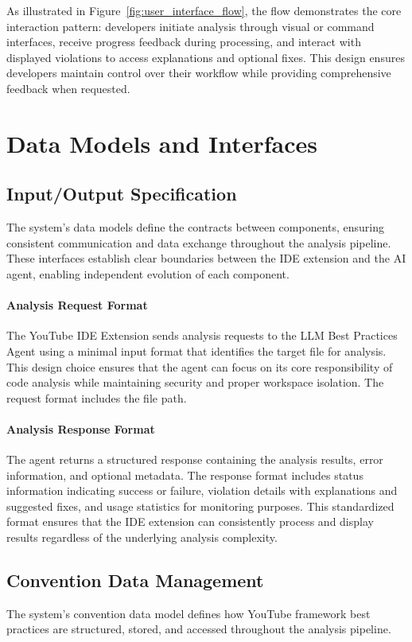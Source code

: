\begin{spacing}{1.2}
As illustrated in Figure~\ref{fig:user_interface_flow}, the flow demonstrates the core interaction pattern: developers initiate analysis through visual or command interfaces, receive progress feedback during processing, and interact with displayed violations to access explanations and optional fixes. This design ensures developers maintain control over their workflow while providing comprehensive feedback when requested.


\section{Data Models and Interfaces}

\subsection{Input/Output Specification}
The system's data models define the contracts between components, ensuring consistent communication and data exchange throughout the analysis pipeline. These interfaces establish clear boundaries between the IDE extension and the AI agent, enabling independent evolution of each component.

\paragraph{Analysis Request Format}
The YouTube IDE Extension sends analysis requests to the LLM Best Practices Agent using a minimal input format that identifies the target file for analysis. This design choice ensures that the agent can focus on its core responsibility of code analysis while maintaining security and proper workspace isolation. The request format includes the file path.

\paragraph{Analysis Response Format}
The agent returns a structured response containing the analysis results, error information, and optional metadata. The response format includes status information indicating success or failure, violation details with explanations and suggested fixes, and usage statistics for monitoring purposes. This standardized format ensures that the IDE extension can consistently process and display results regardless of the underlying analysis complexity.

\subsection{Convention Data Management}
The system's convention data model defines how YouTube framework best practices are structured, stored, and accessed throughout the analysis pipeline.


\end{spacing}
